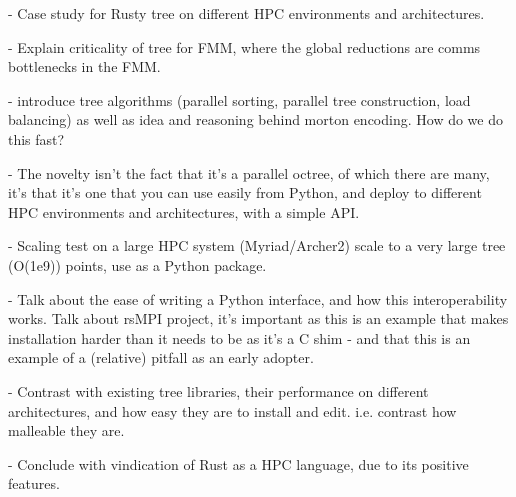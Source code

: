 - Case study for Rusty tree on different HPC environments and architectures. 

- Explain criticality of tree for FMM, where the global reductions are comms bottlenecks in the FMM.

- introduce tree algorithms (parallel sorting, parallel tree construction, load balancing) as well as idea and reasoning behind morton encoding. How do we do this fast? 

- The novelty isn't the fact that it's a parallel octree, of which there are many, it's that it's one that you can use easily from Python, and deploy to different HPC environments and architectures, with a simple API.

- Scaling test on a large HPC system (Myriad/Archer2) scale to a very large tree (O(1e9)) points, use as a Python package. 

- Talk about the ease of writing a Python interface, and how this interoperability works. Talk about rsMPI project, it's important as this is an example that makes installation harder than it needs to be as it's a C shim - and that this is an example of a (relative) pitfall as an early adopter.

- Contrast with existing tree libraries, their performance on different architectures, and how easy they are to install and edit. i.e. contrast how malleable they are.

- Conclude with vindication of Rust as a HPC language, due to its positive features.